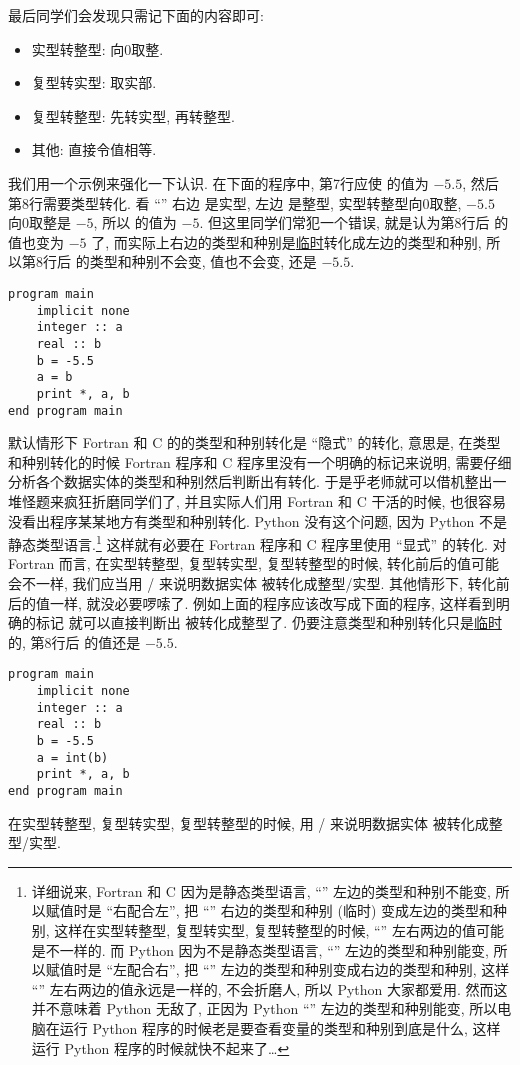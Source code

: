 最后同学们会发现只需记下面的内容即可:
\begin{itemize}
    \item 实型转整型: 向0取整.
    \item 复型转实型: 取实部.
    \item 复型转整型: 先转实型, 再转整型.
    \item 其他: 直接令值相等.
\end{itemize}

我们用一个示例来强化一下认识. 在下面的程序中, 第7行应使  的值为 $-5.5$, 然后第8行需要类型转化. 看 ``\ttt{=}'' 右边  是实型, 左边  是整型, 实型转整型向0取整, $-5.5$ 向0取整是 $-5$, 所以  的值为 $-5$. 但这里同学们常犯一个错误, 就是认为第8行后  的值也变为 $-5$ 了, 而实际上右边的类型和种别是\uline{临时}转化成左边的类型和种别, 所以第8行后  的类型和种别不会变, 值也不会变, 还是 $-5.5$.
\begin{lstlisting}
program main
    implicit none
    integer :: a
    real :: b
    b = -5.5
    a = b
    print *, a, b
end program main
\end{lstlisting}

默认情形下 Fortran 和 C 的的类型和种别转化是 ``隐式'' 的转化, 意思是, 在类型和种别转化的时候 Fortran 程序和 C 程序里没有一个明确的标记来说明, 需要仔细分析各个数据实体的类型和种别然后判断出有转化. 于是乎老师就可以借机整出一堆怪题来疯狂折磨同学们了, 并且实际人们用 Fortran 和 C 干活的时候, 也很容易没看出程序某某地方有类型和种别转化. Python 没有这个问题, 因为 Python 不是静态类型语言.\footnote{详细说来, Fortran 和 C 因为是静态类型语言, ``\ttt{=}'' 左边的类型和种别不能变, 所以赋值时是 ``右配合左'', 把 ``\ttt{=}'' 右边的类型和种别 (临时) 变成左边的类型和种别, 这样在实型转整型, 复型转实型, 复型转整型的时候, ``\ttt{=}'' 左右两边的值可能是不一样的. 而 Python 因为不是静态类型语言, ``\ttt{=}'' 左边的类型和种别能变, 所以赋值时是 ``左配合右'', 把 ``\ttt{=}'' 左边的类型和种别变成右边的类型和种别, 这样 ``\ttt{=}'' 左右两边的值永远是一样的, 不会折磨人, 所以 Python 大家都爱用. 然而这并不意味着 Python 无敌了, 正因为 Python ``\ttt{=}'' 左边的类型和种别能变, 所以电脑在运行 Python 程序的时候老是要查看变量的类型和种别到底是什么, 这样运行 Python 程序的时候就快不起来了\dots{}} 这样就有必要在 Fortran 程序和 C 程序里使用 ``显式'' 的转化. 对 Fortran 而言, 在实型转整型, 复型转实型, 复型转整型的时候, 转化前后的值可能会不一样, 我们应当用 / 来说明数据实体 \ttt{[entity]} 被转化成整型/实型. 其他情形下, 转化前后的值一样, 就没必要啰嗦了. 例如上面的程序应该改写成下面的程序, 这样看到明确的标记  就可以直接判断出  被转化成整型了. 仍要注意类型和种别转化只是\uline{临时}的, 第8行后  的值还是 $-5.5$.
\begin{lstlisting}
program main
    implicit none
    integer :: a
    real :: b
    b = -5.5
    a = int(b)
    print *, a, b
end program main
\end{lstlisting}
\begin{convention}
    在实型转整型, 复型转实型, 复型转整型的时候, 用  / 来说明数据实体 \ttt{\emph{[entity]}} 被转化成整型/实型.
\end{convention}


